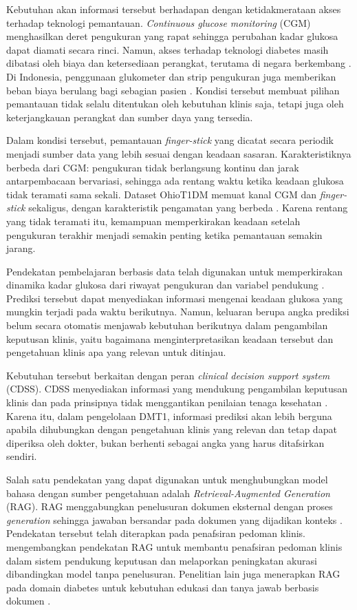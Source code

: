 Kebutuhan akan informasi tersebut berhadapan dengan ketidakmerataan akses terhadap teknologi pemantauan. \textit{Continuous glucose monitoring} (CGM) menghasilkan deret
pengukuran yang rapat sehingga perubahan kadar glukosa dapat diamati secara rinci. Namun, akses terhadap teknologi diabetes masih dibatasi oleh biaya dan ketersediaan
perangkat, terutama di negara berkembang \parencite{santoscastro2025}. Di Indonesia, penggunaan glukometer dan strip pengukuran juga memberikan beban biaya berulang bagi sebagian 
pasien \parencite{ramadaniati2024}. Kondisi tersebut membuat pilihan pemantauan tidak selalu ditentukan oleh kebutuhan klinis saja, tetapi juga oleh keterjangkauan perangkat 
dan sumber daya yang tersedia.

Dalam kondisi tersebut, pemantauan \textit{finger-stick} yang dicatat secara periodik menjadi sumber data yang lebih sesuai dengan keadaan sasaran. Karakteristiknya
berbeda dari CGM: pengukuran tidak berlangsung kontinu dan jarak antarpembacaan bervariasi, sehingga ada rentang waktu ketika keadaan glukosa tidak teramati sama sekali.
Dataset OhioT1DM memuat kanal CGM dan \textit{finger-stick} sekaligus, dengan karakteristik pengamatan yang berbeda \parencite{marling2020}. Karena rentang yang tidak
teramati itu, kemampuan memperkirakan keadaan setelah pengukuran terakhir menjadi semakin penting ketika pemantauan semakin jarang.

Pendekatan pembelajaran berbasis data telah digunakan untuk memperkirakan dinamika kadar glukosa dari riwayat pengukuran dan variabel pendukung \parencite{woldaregay2019}. 
Prediksi tersebut dapat menyediakan informasi mengenai keadaan glukosa yang mungkin terjadi pada waktu berikutnya. Namun, keluaran berupa angka prediksi belum secara otomatis 
menjawab kebutuhan berikutnya dalam pengambilan keputusan klinis, yaitu bagaimana menginterpretasikan keadaan tersebut dan pengetahuan klinis apa yang relevan untuk ditinjau.

Kebutuhan tersebut berkaitan dengan peran \textit{clinical decision support system} (CDSS). CDSS menyediakan informasi yang mendukung pengambilan keputusan klinis dan pada
prinsipnya tidak menggantikan penilaian tenaga kesehatan \parencite{sutton2020}. Karena itu, dalam pengelolaan DMT1, informasi prediksi akan lebih berguna apabila
dihubungkan dengan pengetahuan klinis yang relevan dan tetap dapat diperiksa oleh dokter, bukan berhenti sebagai angka yang harus ditafsirkan sendiri.

Salah satu pendekatan yang dapat digunakan untuk menghubungkan model bahasa dengan sumber pengetahuan adalah \textit{Retrieval-Augmented Generation} (RAG). RAG menggabungkan
penelusuran dokumen eksternal dengan proses \textit{generation} sehingga jawaban bersandar pada dokumen yang dijadikan konteks \parencite{lewis2020,gao2023}. 
Pendekatan tersebut telah diterapkan pada penafsiran pedoman klinis. \textcite{kresevic2024} mengembangkan pendekatan RAG untuk membantu penafsiran pedoman klinis dalam sistem pendukung 
keputusan dan melaporkan peningkatan akurasi dibandingkan model tanpa penelusuran. Penelitian lain juga menerapkan RAG pada domain diabetes untuk 
kebutuhan edukasi dan tanya jawab berbasis dokumen \parencite{lee2024,wang2024}.

